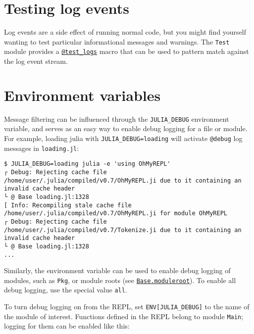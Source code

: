 \hypertarget{5760891326467658260}{}


\section{Testing log events}



Log events are a side effect of running normal code, but you might find yourself wanting to test particular informational messages and warnings. The \texttt{Test} module provides a \hyperlink{1395021091279173086}{\texttt{@test\_logs}} macro that can be used to pattern match against the log event stream.



\hypertarget{2137823180188774840}{}


\section{Environment variables}



Message filtering can be influenced through the \texttt{JULIA\_DEBUG} environment variable, and serves as an easy way to enable debug logging for a file or module. For example, loading julia with \texttt{JULIA\_DEBUG=loading} will activate \texttt{@debug} log messages in \texttt{loading.jl}:




\begin{lstlisting}
$ JULIA_DEBUG=loading julia -e 'using OhMyREPL'
┌ Debug: Rejecting cache file /home/user/.julia/compiled/v0.7/OhMyREPL.ji due to it containing an invalid cache header
└ @ Base loading.jl:1328
[ Info: Recompiling stale cache file /home/user/.julia/compiled/v0.7/OhMyREPL.ji for module OhMyREPL
┌ Debug: Rejecting cache file /home/user/.julia/compiled/v0.7/Tokenize.ji due to it containing an invalid cache header
└ @ Base loading.jl:1328
...
\end{lstlisting}



Similarly, the environment variable can be used to enable debug logging of modules, such as \texttt{Pkg}, or module roots (see \hyperlink{10679300263900972054}{\texttt{Base.moduleroot}}). To enable all debug logging, use the special value \texttt{all}.



To turn debug logging on from the REPL, set \texttt{ENV[{\textquotedbl}JULIA\_DEBUG{\textquotedbl}]} to the name of the module of interest. Functions defined in the REPL belong to module \texttt{Main}; logging for them can be enabled like this:




